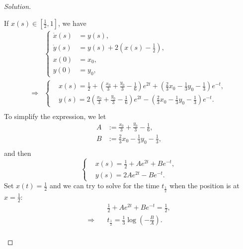 \documentclass[english,reqno]{amsart}
\newenvironment{solution}
  {\renewcommand\qedsymbol{$\blacksquare$}\begin{proof}[Solution]}
  {\end{proof}}
\begin{document}
\begin{enumerate}[label=\arabic*)]
\begin{solution}
\begin{itemize}
\begin{enumerate}
    
If $x(s) \in \left[\frac{1}{2}, 1\right]$, we have
\begin{equation*}
\begin{aligned}
 &\left\{
\begin{aligned}
\dot{x}(s)&=y(s),\\
     \dot{y}(s)&=y(s) + 2\left(x(s)-\frac{1}{2}\right),\\
     x(0)&=x_0,\\
     y(0)&=y_0,
\end{aligned}
\right.\\
\Longrightarrow &
\left\{
    \begin{aligned}
         	& x(s)=\frac{1}{2}+\left(\frac{x_0}{3}+\frac{y_0}{3}-\frac{1}{6}\right)e^{2t} + \left( \frac{2}{3}x_0-\frac{1}{3}y_0-\frac{1}{3}\right) e^{-t},\\
         	& y(s)=2\left(\frac{x_0}{3}+\frac{y_0}{3}-\frac{1}{6}\right)e^{2t} - \left( \frac{2}{3}x_0-\frac{1}{3}y_0-\frac{1}{3}\right) e^{-t}.
    \end{aligned}
\right.\\
\end{aligned}
\end{equation*}
To simplify the expression, we let 
\begin{equation*}
\begin{aligned}
     A &:=\frac{x_0}{3}+\frac{y_0}{3}-\frac{1}{6},\\
    B &:= \frac{2}{3}x_0-\frac{1}{3}y_0-\frac{1}{3},\\
\end{aligned}
\end{equation*}
and then
\begin{equation}
    \left\{
    \begin{aligned}
         	& x(s)=\frac{1}{2}+Ae^{2t} + B e^{-t},\\
         	& y(s)=2Ae^{2t} - B e^{-t}.
    \end{aligned}
\right.
\end{equation}
Set $\displaystyle x(t)=\frac{1}{2}$ and we can try to solve for the time $t_\frac{1}{2}$ when the position is at $x=\frac{1}{2}$:
\begin{equation*}
        \begin{aligned}
         &\frac{1}{2}+Ae^{2t} + B e^{-t} =\frac{1}{2},\\
         	\Longrightarrow \quad & t_\frac{1}{2}=\frac{1}{3} \log \left(-\frac{B}{A}\right).\\
    \end{aligned}
\end{equation*}




\end{enumerate}
\end{itemize}
\end{solution}
\end{enumerate}
\end{document}
